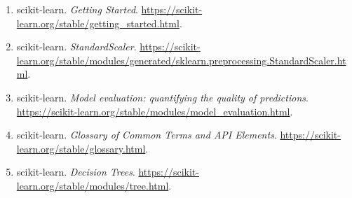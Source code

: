 \begin{enumerate}[leftmargin=2em]
\item scikit-learn. \emph{Getting Started}. \url{https://scikit-learn.org/stable/getting_started.html}.
\item scikit-learn. \emph{StandardScaler}. \url{https://scikit-learn.org/stable/modules/generated/sklearn.preprocessing.StandardScaler.html}.
\item scikit-learn. \emph{Model evaluation: quantifying the quality of predictions}. \url{https://scikit-learn.org/stable/modules/model_evaluation.html}.
\item scikit-learn. \emph{Glossary of Common Terms and API Elements}. \url{https://scikit-learn.org/stable/glossary.html}.
\item scikit-learn. \emph{Decision Trees}. \url{https://scikit-learn.org/stable/modules/tree.html}.
\end{enumerate}\endgroup
